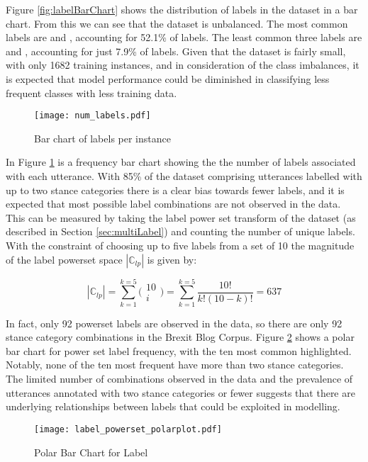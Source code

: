 \documentclass[Dissertation.tex]{subfiles}
\begin{document}
Figure \ref{fig:labelBarChart} shows the distribution of labels in the dataset in a bar chart. From this we can see that the dataset is unbalanced. The most common labels are  and , accounting for 52.1\% of labels.  The least common three labels are  and , accounting for just 7.9\% of labels.  Given that the dataset is fairly small, with only 1682 training instances, and in consideration of the class imbalances, it is expected that model performance could be diminished in classifying less frequent classes with less training data.


\begin{figure}
	\centering
	\texttt{[image: num\_labels.pdf]}
	\caption{Bar chart of labels per instance}
	\label{fig:numLabels}
\end{figure}

In Figure \ref{fig:numLabels} is a frequency bar chart showing the  the number of labels associated with each utterance. With 85\% of the dataset comprising utterances labelled with up to two stance categories there is a clear bias towards fewer labels, and it is expected that most possible label combinations are not observed in the data. This can be measured by taking the label power set transform of the dataset (as described in Section \ref{sec:multiLabel}) and counting the number of unique labels. With the constraint of choosing up to five labels from a set of 10 the magnitude of the label powerset space $ |\mathbb{C}_{lp}| $ is given by:

\[ |\mathbb{C}_{lp}| = \sum_{k=1}^{k=5}\bigg( 		\begin{array}{c}
10\\
i
\end{array} \bigg) = \sum_{k=1}^{k=5}\frac{10!}{k!(10-k)!} = 637 \]


In fact, only 92 powerset labels are observed in the data, so there are only 92 stance category combinations in the Brexit Blog Corpus. Figure \ref{fig:polarBarChart} shows a polar bar chart for power set label frequency, with the ten most common highlighted. Notably, none of the ten most frequent have more than two stance categories. The limited number of combinations observed in the data and the prevalence of utterances annotated with two stance categories or fewer suggests that there are underlying relationships between labels that could be exploited in modelling.
\begin{figure}
	\centering
	
	\texttt{[image: label\_powerset\_polarplot.pdf]}
	\caption{Polar Bar Chart for Label}
	\label{fig:polarBarChart}
\end{figure}
\end{document}
